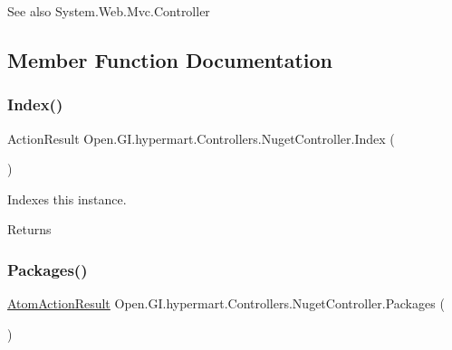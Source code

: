 \begin{DoxySeeAlso}{See also}
System.\+Web.\+Mvc.\+Controller


\end{DoxySeeAlso}


\subsection{Member Function Documentation}
\hypertarget{class_open_1_1_g_i_1_1hypermart_1_1_controllers_1_1_nuget_controller_a4512f0f0edfb480430dea27f009d37a6}{}\label{class_open_1_1_g_i_1_1hypermart_1_1_controllers_1_1_nuget_controller_a4512f0f0edfb480430dea27f009d37a6} 
\subsubsection{\texorpdfstring{Index()}{Index()}}
{\footnotesize\ttfamily Action\+Result Open.\+G\+I.\+hypermart.\+Controllers.\+Nuget\+Controller.\+Index (\begin{DoxyParamCaption}{ }\end{DoxyParamCaption})}



Indexes this instance. 

\begin{DoxyReturn}{Returns}

\end{DoxyReturn}
\hypertarget{class_open_1_1_g_i_1_1hypermart_1_1_controllers_1_1_nuget_controller_a8b2f4aa532a73eaacab1efcfd3fed054}{}\label{class_open_1_1_g_i_1_1hypermart_1_1_controllers_1_1_nuget_controller_a8b2f4aa532a73eaacab1efcfd3fed054} 
\subsubsection{\texorpdfstring{Packages()}{Packages()}}
{\footnotesize\ttfamily \hyperlink{class_open_1_1_g_i_1_1hypermart_1_1_helpers_1_1_atom_action_result}{Atom\+Action\+Result} Open.\+G\+I.\+hypermart.\+Controllers.\+Nuget\+Controller.\+Packages (\begin{DoxyParamCaption}{ }\end{DoxyParamCaption})}



